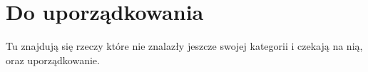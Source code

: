 \chapter{Do uporządkowania}
Tu znajdują się rzeczy które nie znalazły jeszcze swojej kategorii i czekają na nią, oraz uporządkowanie.
